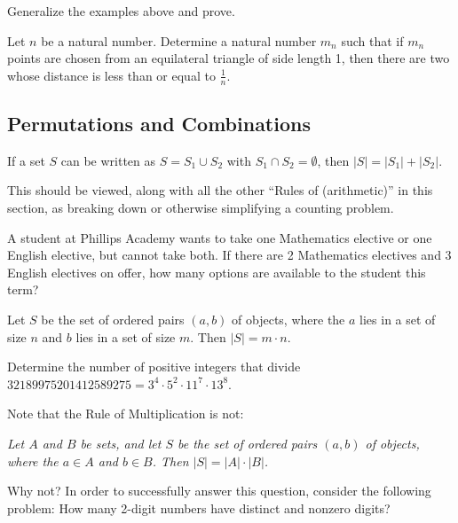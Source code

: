\begin{exercise} Generalize the examples above and prove.
\end{exercise}

\begin{example} Let $n$ be a natural number. Determine a natural number $m_n$ such that if $m_n$ points are chosen from an equilateral triangle of side length 1, then there are two whose distance is less than or equal to $\frac{1}{n}$.
\end{example}

\subsection{Permutations and Combinations}
\begin{theorem} If a set $S$ can be written as $S = S_1 \cup S_2$ with $S_1 \cap S_2 = \emptyset$, then $|S| = |S_1| + |S_2|$.
\end{theorem}

\begin{remark} This should be viewed, along with all the other ``Rules of (arithmetic)'' in this section, as breaking down or otherwise simplifying a counting problem.
\end{remark}

\begin{example} A student at Phillips Academy wants to take one Mathematics elective or one English elective, but cannot take both.  If there are 2 Mathematics electives and 3 English electives on offer, how many options are available to the student this term?
\end{example}

\begin{theorem} Let $S$ be the set of ordered pairs $(a, b)$ of objects, where the $a$ lies in a set of size $n$ and $b$ lies in a set of size $m$.  Then $|S| = m \cdot n$.
\end{theorem}

\begin{example} Determine the number of positive integers that divide $32189975201412589275 = 3^4 \cdot 5^2 \cdot 11^7 \cdot 13^8$.
\end{example}

\begin{question} Note that the Rule of Multiplication is not:

    \textit{Let $A$ and $B$ be sets, and let $S$ be the set of ordered pairs $(a, b)$ of objects, where the $a\in A$ and $b \in B$.  Then $|S| = |A| \cdot |B|$.}

    Why not?  In order to successfully answer this question, consider the following problem: How many 2-digit numbers have distinct and nonzero digits?
\end{question}

